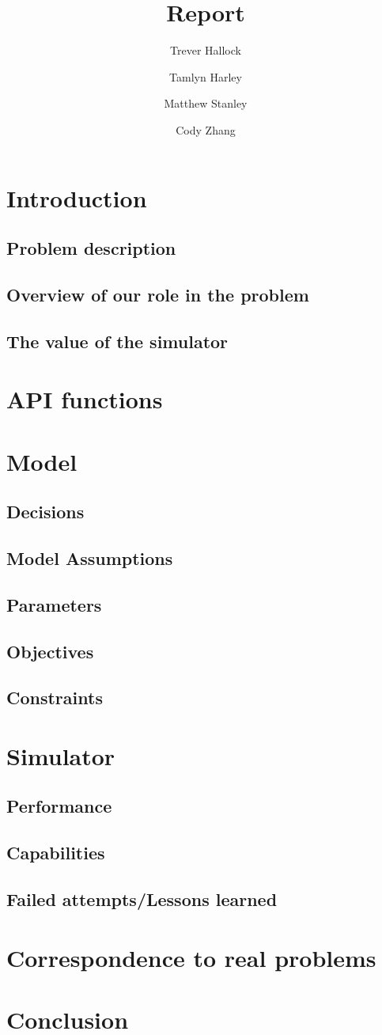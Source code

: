 \documentclass{article}
\title{Report}
\author{
	Trever Hallock \and
	Tamlyn Harley \and
	Matthew Stanley \and
	Cody Zhang
}
\begin{document}
\maketitle


\section{Introduction}
\subsection{Problem description}
\subsection{Overview of our role in the problem}
\subsection{The value of the simulator}
\section{API functions}
\section{Model}
\subsection{Decisions}
\subsection{Model Assumptions}
\subsection{Parameters}
\subsection{Objectives}
\subsection{Constraints}
\section{Simulator}
\subsection{Performance}
\subsection{Capabilities}
\subsection{Failed attempts/Lessons learned}
\section{Correspondence to real problems}
\section{Conclusion}
\end{document}
